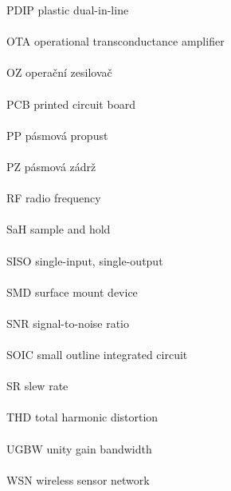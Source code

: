 PDIP \hfill plastic dual-in-line \\ \\
OTA \hfill operational transconductance amplifier \\ \\
OZ \hfill operační zesilovač \\ \\
PCB \hfill printed circuit board \\ \\
PP \hfill pásmová propust \\ \\
PZ \hfill pásmová zádrž \\ \\
RF \hfill radio frequency \\ \\
SaH \hfill sample and hold \\ \\
SISO \hfill single-input, single-output \\ \\
SMD \hfill surface mount device \\ \\
SNR \hfill signal-to-noise ratio \\ \\
SOIC \hfill small outline integrated circuit \\ \\
SR \hfill slew rate \\ \\
THD \hfill total harmonic distortion \\ \\
UGBW \hfill unity gain bandwidth \\ \\
WSN \hfill wireless sensor network \\ \\